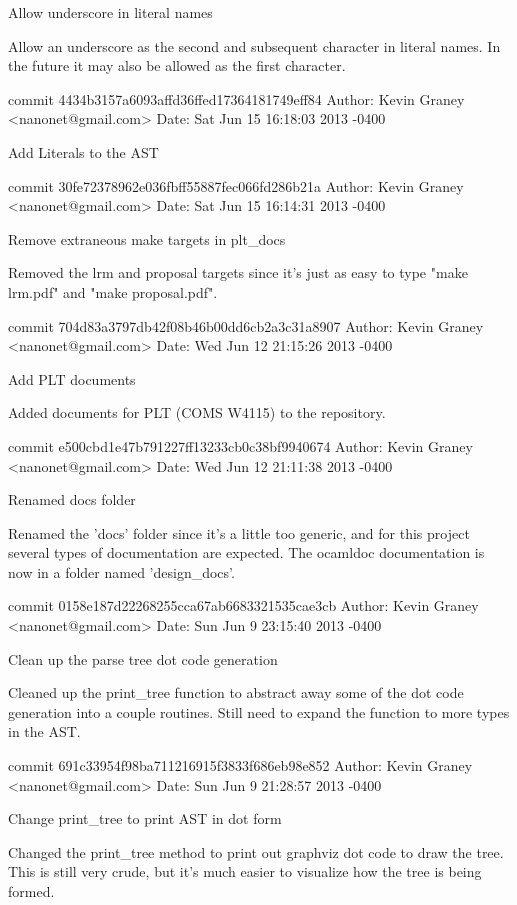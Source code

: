     Allow underscore in literal names
    
    Allow an underscore as the second and subsequent character in
    literal names.  In the future it may also be allowed as the first
    character.

commit 4434b3157a6093affd36ffed17364181749eff84
Author: Kevin Graney <nanonet@gmail.com>
Date:   Sat Jun 15 16:18:03 2013 -0400

    Add Literals to the AST

commit 30fe72378962e036fbff55887fec066fd286b21a
Author: Kevin Graney <nanonet@gmail.com>
Date:   Sat Jun 15 16:14:31 2013 -0400

    Remove extraneous make targets in plt_docs
    
    Removed the lrm and proposal targets since it's just as easy
    to type "make lrm.pdf" and "make proposal.pdf".

commit 704d83a3797db42f08b46b00dd6cb2a3c31a8907
Author: Kevin Graney <nanonet@gmail.com>
Date:   Wed Jun 12 21:15:26 2013 -0400

    Add PLT documents
    
    Added documents for PLT (COMS W4115) to the repository.

commit e500cbd1e47b791227ff13233cb0c38bf9940674
Author: Kevin Graney <nanonet@gmail.com>
Date:   Wed Jun 12 21:11:38 2013 -0400

    Renamed docs folder
    
    Renamed the 'docs' folder since it's a little too generic, and for
    this project several types of documentation are expected.  The
    ocamldoc documentation is now in a folder named 'design_docs'.

commit 0158e187d22268255cca67ab6683321535cae3cb
Author: Kevin Graney <nanonet@gmail.com>
Date:   Sun Jun 9 23:15:40 2013 -0400

    Clean up the parse tree dot code generation
    
    Cleaned up the print_tree function to abstract away some of the
    dot code generation into a couple routines.  Still need to expand
    the function to more types in the AST.

commit 691c33954f98ba711216915f3833f686eb98e852
Author: Kevin Graney <nanonet@gmail.com>
Date:   Sun Jun 9 21:28:57 2013 -0400

    Change print_tree to print AST in dot form
    
    Changed the print_tree method to print out graphviz dot code to
    draw the tree.  This is still very crude, but it's much easier to
    visualize how the tree is being formed.
    
